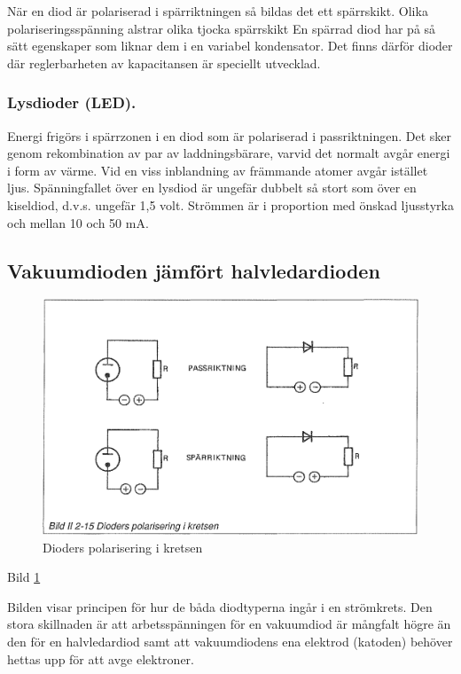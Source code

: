   När en diod är polariserad i spärriktningen så bildas det ett spärrskikt.
  Olika polariseringsspänning alstrar olika tjocka spärrskikt En spärrad diod
  har på så sätt egenskaper som liknar dem i en variabel kondensator. Det finns
  därför dioder där reglerbarheten av kapacitansen är speciellt utvecklad.

\subsubsection{Lysdioder (LED).}

  Energi frigörs i spärrzonen i en diod som är polariserad i passriktningen. Det
  sker genom rekombination av par av laddningsbärare, varvid det normalt avgår
  energi i form av värme. Vid en viss inblandning av främmande atomer avgår
  istället ljus. Spänningfallet över en lysdiod är ungefär dubbelt så stort som
  över en kiseldiod, d.v.s. ungefär 1,5 volt. Strömmen är i proportion med
  önskad ljusstyrka och mellan 10 och 50 mA.


\subsection{Vakuumdioden jämfört halvledardioden}

\begin{figure}
\includegraphics[width=\textwidth]{images/bild_2_2-15}
\caption{Dioders polarisering i kretsen}
\label{fig:BildII2-15}
\end{figure}

Bild \ref{fig:BildII2-15}

Bilden visar principen för hur de båda diodtyperna ingår i en strömkrets. Den
stora skillnaden är att arbetsspänningen för en vakuumdiod är mångfalt högre än
den för en halvledardiod samt att vakuumdiodens ena elektrod (katoden) behöver
hettas upp för att avge elektroner.

